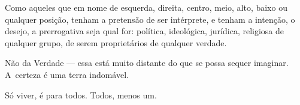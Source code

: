  

Como aqueles que em nome de esquerda, direita, centro, meio, alto, baixo
ou qualquer posição, tenham a pretensão de ser intérprete, e tenham a
intenção, o desejo, a prerrogativa seja qual for: política, ideológica,
jurídica, religiosa de qualquer grupo, de serem proprietários de
qualquer verdade.

Não da Verdade --- essa está muito distante do que se possa sequer
imaginar. A~certeza é uma terra indomável.

Só viver, é para todos. Todos, menos um.%

\fechafala 

